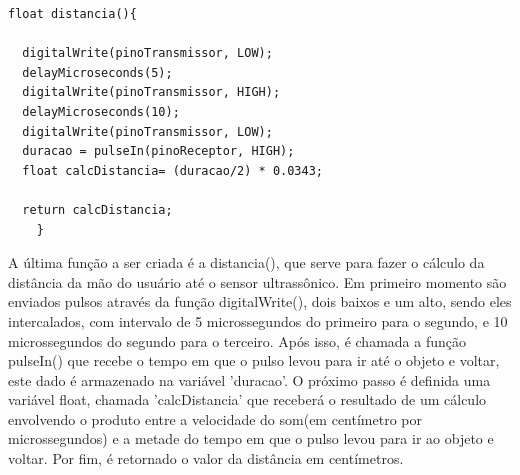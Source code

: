 \documentclass[conference]{IEEEtran}
\begin{document}
                \begin{lstlisting}
float distancia(){  
  
  digitalWrite(pinoTransmissor, LOW);
  delayMicroseconds(5);
  digitalWrite(pinoTransmissor, HIGH); 
  delayMicroseconds(10);
  digitalWrite(pinoTransmissor, LOW);
  duracao = pulseIn(pinoReceptor, HIGH);
  float calcDistancia= (duracao/2) * 0.0343; 
  
  return calcDistancia;  
    }
        \end{lstlisting}
        A última função a ser criada é a distancia(), que serve
        para fazer o cálculo da distância da mão do usuário até
        o sensor ultrassônico. Em primeiro momento são enviados
        pulsos através da função digitalWrite(), dois baixos e um alto,
        sendo eles intercalados, com intervalo de 5 microssegundos do
        primeiro para o segundo, e 10 microssegundos do segundo para
        o terceiro. Após isso, é chamada a função pulseIn() que recebe
        o tempo em que o pulso levou para ir até o objeto e voltar,
        este dado é armazenado na variável ’duracao’. O próximo
        passo é definida uma variável float, chamada ’calcDistancia’
        que receberá o resultado de um cálculo envolvendo o produto
        entre a velocidade do som(em centímetro por microssegundos)
        e a metade do tempo em que o pulso levou para ir ao
        objeto e voltar. Por fim, é retornado o valor da distância em
        centímetros.
\end{document}
